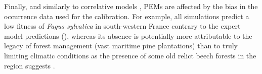 \documentclass[letterpaper,8pt]{extarticle}  %
\begin{document}
\begin{doublespacing}
\begin{linenumbers}

Finally, and similarly to correlative models \citep{BarbetMassin2010, Duputie2014},  PEMs are affected by the bias in the occurrence data used for the calibration. For example, all simulations predict a low fitness of \emph{Fagus sylvatica} in south-western France contrary to the expert model predictions (), whereas its absence is potentially more attributable to the legacy of forest management (vast maritime pine plantations) than to truly limiting climatic conditions as the presence of some old relict beech forests in the region suggests \citep{Lafontaine2014}.


\end{linenumbers}
\end{doublespacing}
\end{document}
